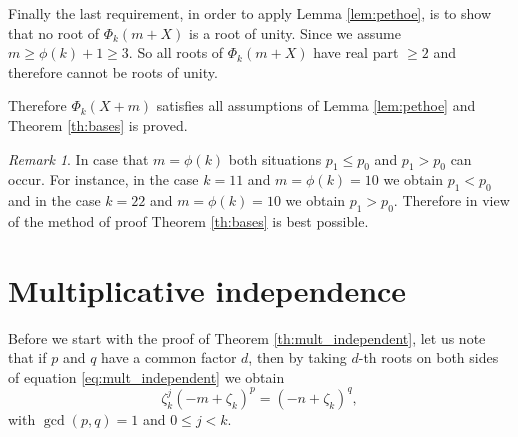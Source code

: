 \documentclass{amsart}
\theoremstyle{plain}
\numberwithin{equation}{section}
\theoremstyle{remark}
\newtheorem{remark}{Remark}
\begin{document}
Finally the last requirement, in order to apply Lemma
\ref{lem:pethoe}, is to show that no root of $\Phi_k(m+X)$ is a root
of unity. Since we assume $m\geq \phi(k)+1\geq 3$. So all roots of
$\Phi_k(m+X)$ have real part $\geq 2$ and therefore cannot be roots of
unity.

Therefore $\Phi_k(X+m)$ satisfies all assumptions of Lemma
\ref{lem:pethoe} and Theorem \ref{th:bases} is proved.

\begin{remark}
  
  
  
  
  
  In case that $m=\phi(k)$ both situations $p_1\leq p_0$ and $p_1>p_0$
  can occur. For instance, in the case $k=11$ and $m=\phi(k)=10$ we
  obtain $p_1<p_0$ and in the case $k=22$ and $m=\phi(k)=10$ we obtain
  $p_1>p_0$. Therefore in view of the method of proof Theorem
  \ref{th:bases} is best possible.
\end{remark}

\section{Multiplicative independence}

Before we start with the proof of Theorem \ref{th:mult_independent}, let us note that if $p$ and $q$ have a
common factor $d$, then by taking $d$-th roots on both sides of equation \eqref{eq:mult_independent} we obtain
\begin{equation}\label{eq:mult_ind2}
 \zeta_k^j(-m+\zeta_k)^p=(-n+\zeta_k)^q,
\end{equation}
with  $\gcd(p,q)=1$ and $0\leq j<k$.
\end{document}
